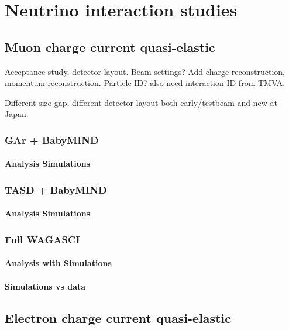 \chapter{Neutrino interaction studies}
\label{c:neutrino}

\section{Muon charge current quasi-elastic}

Acceptance study, detector layout. Beam settings? Add charge reconstruction, momentum reconstruction. Particle ID? also need interaction ID from TMVA.

Different size gap, different detector layout both early/testbeam and new at Japan.

\subsection{GAr + BabyMIND}
\subsubsection{Analysis Simulations}
\subsection{TASD + BabyMIND}
\subsubsection{Analysis Simulations}
\subsection{Full WAGASCI}
\subsubsection{Analysis with Simulations}
\subsubsection{Simulations vs data}

\section{Electron charge current quasi-elastic}